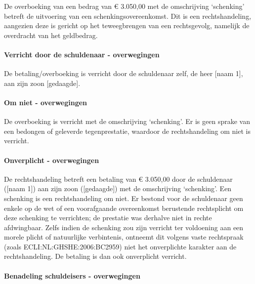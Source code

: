 \documentclass[
  dutch,
  a4paper,
]{article}
\begin{document}
De overboeking van een bedrag van € 3.050,00 met de omschrijving `schenking' betreft de uitvoering van een schenkingsovereenkomst. Dit is een rechtshandeling, aangezien deze is gericht op het teweegbrengen van een rechtsgevolg, namelijk de overdracht van het geldbedrag.

\paragraph{Verricht door de schuldenaar - overwegingen}\label{verricht-door-de-schuldenaar---overwegingen-32}

De betaling/overboeking is verricht door de schuldenaar zelf, de heer {[}naam 1{]}, aan zijn zoon {[}gedaagde{]}.

\paragraph{Om niet - overwegingen}\label{om-niet---overwegingen-32}

De overboeking is verricht met de omschrijving `schenking'. Er is geen sprake van een bedongen of geleverde tegenprestatie, waardoor de rechtshandeling om niet is verricht.

\paragraph{Onverplicht - overwegingen}\label{onverplicht---overwegingen-32}

De rechtshandeling betreft een betaling van € 3.050,00 door de schuldenaar ({[}naam 1{]}) aan zijn zoon ({[}gedaagde{]}) met de omschrijving `schenking'. Een schenking is een rechtshandeling om niet. Er bestond voor de schuldenaar geen enkele op de wet of een voorafgaande overeenkomst berustende rechtsplicht om deze schenking te verrichten; de prestatie was derhalve niet in rechte afdwingbaar. Zelfs indien de schenking zou zijn verricht ter voldoening aan een morele plicht of natuurlijke verbintenis, ontneemt dit volgens vaste rechtspraak (zoals ECLI:NL:GHSHE:2006:BC2959) niet het onverplichte karakter aan de rechtshandeling. De betaling is dan ook onverplicht verricht.

\paragraph{Benadeling schuldeisers - overwegingen}\label{benadeling-schuldeisers---overwegingen-32}
\end{document}
